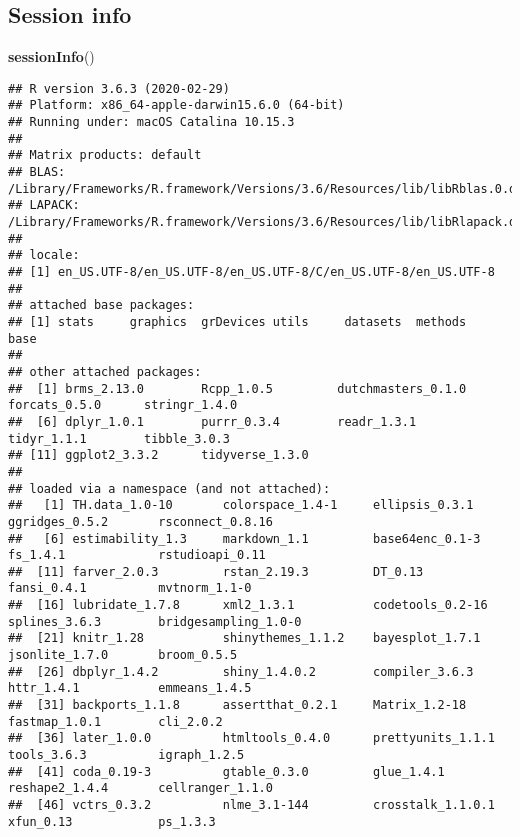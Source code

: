 \documentclass[]{article}
\newenvironment{Shaded}{\begin{snugshade}}{\end{snugshade}}
\newcommand{\KeywordTok}[1]{\textcolor[rgb]{0.13,0.29,0.53}{\textbf{#1}}}
\newcommand{\NormalTok}[1]{#1}
\begin{document}
\hypertarget{session-info}{%
\subsection*{Session info}\label{session-info}}

\begin{Shaded}
\begin{Highlighting}[]
\KeywordTok{sessionInfo}\NormalTok{()}
\end{Highlighting}
\end{Shaded}

\begin{verbatim}
## R version 3.6.3 (2020-02-29)
## Platform: x86_64-apple-darwin15.6.0 (64-bit)
## Running under: macOS Catalina 10.15.3
## 
## Matrix products: default
## BLAS:   /Library/Frameworks/R.framework/Versions/3.6/Resources/lib/libRblas.0.dylib
## LAPACK: /Library/Frameworks/R.framework/Versions/3.6/Resources/lib/libRlapack.dylib
## 
## locale:
## [1] en_US.UTF-8/en_US.UTF-8/en_US.UTF-8/C/en_US.UTF-8/en_US.UTF-8
## 
## attached base packages:
## [1] stats     graphics  grDevices utils     datasets  methods   base     
## 
## other attached packages:
##  [1] brms_2.13.0        Rcpp_1.0.5         dutchmasters_0.1.0 forcats_0.5.0      stringr_1.4.0     
##  [6] dplyr_1.0.1        purrr_0.3.4        readr_1.3.1        tidyr_1.1.1        tibble_3.0.3      
## [11] ggplot2_3.3.2      tidyverse_1.3.0   
## 
## loaded via a namespace (and not attached):
##   [1] TH.data_1.0-10       colorspace_1.4-1     ellipsis_0.3.1       ggridges_0.5.2       rsconnect_0.8.16    
##   [6] estimability_1.3     markdown_1.1         base64enc_0.1-3      fs_1.4.1             rstudioapi_0.11     
##  [11] farver_2.0.3         rstan_2.19.3         DT_0.13              fansi_0.4.1          mvtnorm_1.1-0       
##  [16] lubridate_1.7.8      xml2_1.3.1           codetools_0.2-16     splines_3.6.3        bridgesampling_1.0-0
##  [21] knitr_1.28           shinythemes_1.1.2    bayesplot_1.7.1      jsonlite_1.7.0       broom_0.5.5         
##  [26] dbplyr_1.4.2         shiny_1.4.0.2        compiler_3.6.3       httr_1.4.1           emmeans_1.4.5       
##  [31] backports_1.1.8      assertthat_0.2.1     Matrix_1.2-18        fastmap_1.0.1        cli_2.0.2           
##  [36] later_1.0.0          htmltools_0.4.0      prettyunits_1.1.1    tools_3.6.3          igraph_1.2.5        
##  [41] coda_0.19-3          gtable_0.3.0         glue_1.4.1           reshape2_1.4.4       cellranger_1.1.0    
##  [46] vctrs_0.3.2          nlme_3.1-144         crosstalk_1.1.0.1    xfun_0.13            ps_1.3.3            

\end{verbatim}
\end{document}
